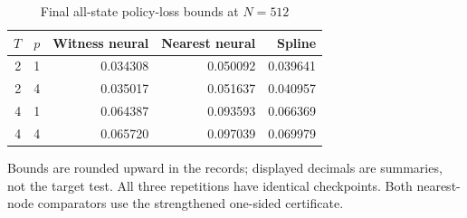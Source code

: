 \begin{table}[htbp]\centering
\caption{Final all-state policy-loss bounds at $N=512$}\label{tab:witness46}
\begin{tabular}{rrrrr}\toprule
$T$ & $p$ & Witness neural & Nearest neural & Spline \\ \midrule
2 & 1 & 0.034308 & 0.050092 & 0.039641 \\
2 & 4 & 0.035017 & 0.051637 & 0.040957 \\
4 & 1 & 0.064387 & 0.093593 & 0.066369 \\
4 & 4 & 0.065720 & 0.097039 & 0.069979 \\
\bottomrule\end{tabular}
\par\smallskip\footnotesize Bounds are rounded upward in the records; displayed decimals are summaries, not the target test. All three repetitions have identical checkpoints. Both nearest-node comparators use the strengthened one-sided certificate.
\end{table}
